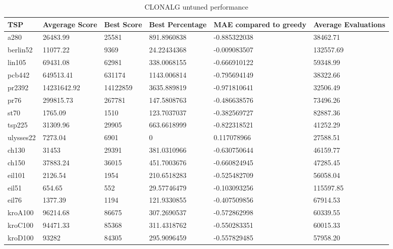 \begin{table}[H]
	\begin{tabular}{|l|l|l|p{2cm}|p{2.5cm}|p{2cm}|}
		\hline
	TSP	& Avgerage Score & Best Score & Best Percentage &\textbf{ MAE compared to greedy} & Average Evaluations \\ \hline
		a280      & 26483.99       & 25581      & 891.8960838     & -0.885322038           & 38462.71            \\ \hline
		berlin52  & 11077.22       & 9369       & 24.22434368     & -0.009083507           & 132557.69           \\ \hline
		lin105    & 69431.08       & 62981      & 338.0068155     & -0.666910122           & 59348.99            \\ \hline
		pcb442    & 649513.41      & 631174     & 1143.006814     & -0.795694149           & 38322.66            \\ \hline
		pr2392    & 14231642.92    & 14122859   & 3635.889819     & -0.971810641           & 32506.49            \\ \hline
		pr76      & 299815.73      & 267781     & 147.5808763     & -0.486638576           & 73496.26            \\ \hline
		st70      & 1765.09        & 1510       & 123.7037037     & -0.382569727           & 82887.36            \\ \hline
		tsp225    & 31309.96       & 29905      & 663.6618999     & -0.822318521           & 41252.29            \\ \hline
		ulysses22 & 7273.04        & 6901       & 0               & 0.117078966            & 27588.51            \\ \hline
		ch130     & 31453          & 29391      & 381.0310966     & -0.630750644           & 46159.77            \\ \hline
		ch150     & 37883.24       & 36015      & 451.7003676     & -0.660824945           & 47285.45            \\ \hline
		eil101    & 2126.54        & 1954       & 210.6518283     & -0.525482709           & 56058.04            \\ \hline
		eil51     & 654.65         & 552        & 29.57746479     & -0.103093256           & 115597.85           \\ \hline
		eil76     & 1377.39        & 1194       & 121.9330855     & -0.407509856           & 67914.53            \\ \hline
		kroA100   & 96214.68       & 86675      & 307.2690537     & -0.572862998           & 60339.55            \\ \hline
		kroC100   & 94471.33       & 85368      & 311.4318762     & -0.550283351           & 60015.33            \\ \hline
		kroD100   & 93282          & 84305      & 295.9096459     & -0.557829485           & 57958.20            \\ \hline
	\end{tabular}
	\caption{CLONALG untuned performance}
	\label{tab:clonalg_untuned}
\end{table}
